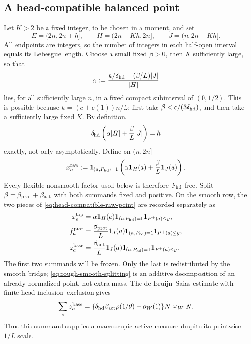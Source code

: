 \documentclass[11pt]{article}
\numberwithin{equation}{section}
\theoremstyle{definition}
\theoremstyle{remark}
\newcommand{\1}{\mathbf 1}
\begin{document}
\subsection{A head-compatible balanced point}
\label{subsec:head-compatible-point}

Let \(K>2\) be a fixed integer, to be chosen in a moment, and set
\[
 E=(2n,2n+h],\qquad H=(2n-Kh,2n],\qquad
 J=(n,2n-Kh].
\]
All endpoints are integers, so the number of integers in each half-open
interval equals its Lebesgue length.  Choose a small fixed \(\beta>0\),
then \(K\) sufficiently large, so that
\begin{equation}
 \alpha:=\frac{h/\delta_{\rm hd}-(\beta/L)|J|}{|H|}
 \label{eq:rough-alpha}
\end{equation}
lies, for all sufficiently large \(n\), in a fixed compact subinterval of
\((0,1/2)\).  This is possible because \(h=(c+o(1))n/L\): first take
\(\beta<c/(3\delta_{\rm hd})\), and then take a sufficiently large fixed
\(K\).  By definition,
\begin{equation}
 \delta_{\rm hd}\left(\alpha |H|+\frac\beta L|J|\right)=h
 \label{eq:head-balanced-normalization}
\end{equation}
exactly, not only asymptotically.  Define on \((n,2n]\)
\begin{equation}
 x_a^{\rm raw}:=\1_{(a,P_{\rm hd})=1}
   \left(\alpha\1_H(a)+\frac\beta L\1_J(a)\right).
 \label{eq:head-compatible-raw-point}
\end{equation}
Every flexible nonsmooth factor used below is therefore
\(F_{\rm hd}\)-free.  Split
\(
 \beta=\beta_{\rm prot}+\beta_{\rm act}
\)
with both summands fixed and positive.  On the smooth row, the two pieces
of \eqref{eq:head-compatible-raw-point} are recorded separately as
\begin{align}
 x_a^{\rm top}&=\alpha\1_H(a)\1_{(a,P_{\rm hd})=1}
                    \1_{P^+(a)\le y},\notag\\
 f_a^{\rm prot}&=\frac{\beta_{\rm prot}}L\1_J(a)
                    \1_{(a,P_{\rm hd})=1}\1_{P^+(a)\le y},\notag\\
 z_a^{\rm base}&=\frac{\beta_{\rm act}}L\1_J(a)
                    \1_{(a,P_{\rm hd})=1}\1_{P^+(a)\le y}.
 \label{eq:rough-smooth-splitting}
\end{align}
The first two summands will be frozen.  Only the last is redistributed by
the smooth bridge; \eqref{eq:rough-smooth-splitting} is an additive
decomposition of an already normalized point, not extra mass.  The
de Bruijn--Saias estimate with finite head inclusion--exclusion gives
\begin{equation}
 \sum_a z_a^{\rm base}
 =\{\delta_{\rm hd}\beta_{\rm act}\rho(1/\theta)+o_W(1)\}N
 \asymp_W N.
 \label{eq:rough-active-smooth-mass}
\end{equation}
Thus this summand supplies a macroscopic active measure despite its
pointwise \(1/L\) scale.
\end{document}
